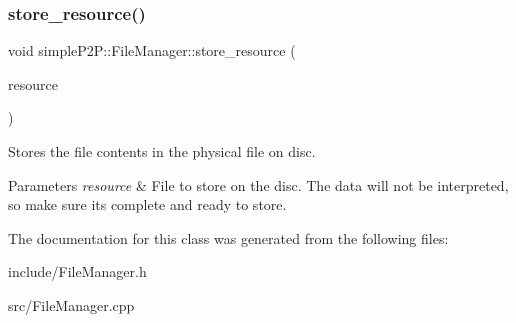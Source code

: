 \subsubsection{\texorpdfstring{store\+\_\+resource()}{store\_resource()}}
{\footnotesize\ttfamily void simple\+P2\+P\+::\+File\+Manager\+::store\+\_\+resource (\begin{DoxyParamCaption}\item[{\hyperlink{classsimpleP2P_1_1CompleteResource}{Complete\+Resource} \&}]{resource }\end{DoxyParamCaption})}



Stores the file contents in the physical file on disc. 


\begin{DoxyParams}{Parameters}
{\em resource} & File to store on the disc. The data will not be interpreted, so make sure it\textquotesingle{}s complete and ready to store. \\
\hline
\end{DoxyParams}


The documentation for this class was generated from the following files\+:\begin{DoxyCompactItemize}
\item 
include/File\+Manager.\+h\item 
src/File\+Manager.\+cpp\end{DoxyCompactItemize}
